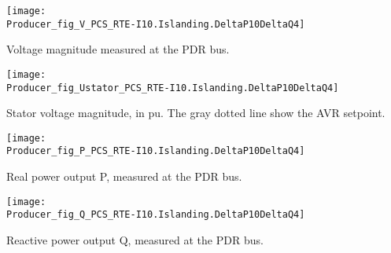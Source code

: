     \noindent
    \begin{minipage}[t]{0.48\textwidth}
        \centering
        \texttt{[image: \\Producer\_fig\_V\_PCS\_RTE-I10.Islanding.DeltaP10DeltaQ4]}
        \begin{minipage}[t]{0.8\textwidth}
            \small Voltage magnitude measured at the PDR bus.
        \end{minipage}
    \end{minipage}
    \hfill
    \begin{minipage}[t]{0.48\textwidth}
        \centering
        \texttt{[image: \\Producer\_fig\_Ustator\_PCS\_RTE-I10.Islanding.DeltaP10DeltaQ4]}
        \begin{minipage}[t]{0.8\textwidth}
            \small Stator voltage magnitude, in pu. The gray dotted line show
            the AVR setpoint.
        \end{minipage}
    \end{minipage}

    \vspace{0.5cm}

    \noindent
    \begin{minipage}[t]{0.48\textwidth}
        \centering
        \texttt{[image: \\Producer\_fig\_P\_PCS\_RTE-I10.Islanding.DeltaP10DeltaQ4]}
        \begin{minipage}[t]{0.8\textwidth}
            \small Real power output P, measured at the PDR bus.
        \end{minipage}
    \end{minipage}
    \hfill
    \begin{minipage}[t]{0.48\textwidth}
        \centering
        \texttt{[image: \\Producer\_fig\_Q\_PCS\_RTE-I10.Islanding.DeltaP10DeltaQ4]}
        \begin{minipage}[t]{0.8\textwidth}
            \small Reactive power output Q, measured at the PDR bus.
        \end{minipage}
    \end{minipage}

    \vspace{0.5cm}


